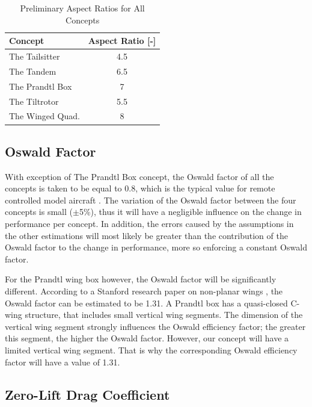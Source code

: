 \begin{table}[htb]
    \centering
    \caption{Preliminary Aspect Ratios for All Concepts}
    \label{tab:AR}
    \begin{tabularx}{0.5\textwidth}{lc}
        \toprule
        \textbf{Concept} & \textbf{Aspect Ratio [-]} \\
        \midrule
        The Tailsitter          & 4.5 \\ \hdashline
        The Tandem              & 6.5 \\ \hdashline
        The Prandtl Box         & 7  \\ \hdashline
        The Tiltrotor           & 5.5   \\ \hdashline
        The Winged Quad.        & 8 \\\bottomrule
    \end{tabularx}
\end{table}

\subsection{Oswald Factor}

With exception of The Prandtl Box concept, the Oswald factor of all the concepts is taken to be equal to 0.8, which is the typical value for remote controlled model aircraft \cite{drag_ch3}. The variation of the Oswald factor between the four concepts is small ($\pm$5\%), thus it will have a negligible influence on the change in performance per concept. In addition, the errors caused by the assumptions in the other estimations will most likely be greater than the contribution of the Oswald factor to the change in performance, more so enforcing a constant Oswald factor.

For the Prandtl wing box however, the Oswald factor will be significantly different. According to a Stanford research paper on non-planar wings \cite{Oswald}, the Oswald factor can be estimated to be 1.31. A Prandtl box has a quasi-closed C-wing structure, that includes small vertical wing segments. The dimension of the vertical wing segment strongly influences the Oswald efficiency factor; the greater this segment, the higher the Oswald factor. However, our concept will have a limited vertical wing segment. That is why the corresponding Oswald efficiency factor will have a value of 1.31. 

\subsection{Zero-Lift Drag Coefficient}
\label{sec:zeroliftdrag}

